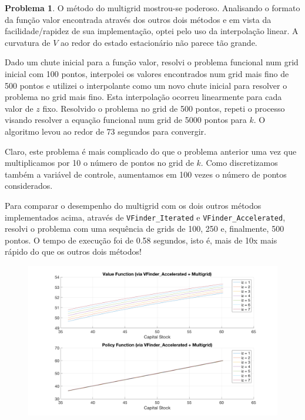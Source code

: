 \documentclass[11pt]{article}
\theoremstyle{definition}
\theoremstyle{definition}
\newtheorem{problema}{Problema}
\theoremstyle{solution}
\begin{document}
	
\begin{problema}
	O método do multigrid mostrou-se poderoso. Analisando o formato da função valor encontrada através dos outros dois métodos e em vista da facilidade/rapidez de sua implementação, optei pelo uso da interpolação linear. A curvatura de $V$ ao redor do estado estacionário não parece tão grande.
	
	Dado um chute inicial para a função valor, resolvi o problema funcional num grid inicial com 100 pontos, interpolei os valores encontrados num grid mais fino de 500 pontos e utilizei o interpolante como um novo chute inicial para resolver o problema no grid mais fino. Esta interpolação ocorreu linearmente para cada valor de $z$ fixo. Resolvido o problema no grid de 500 pontos, repeti o processo visando resolver a equação funcional num grid de 5000 pontos para $k$. O algoritmo levou ao redor de 73 segundos para convergir.
		
	Claro, este problema é mais complicado do que o problema anterior uma vez que multiplicamos por 10 o número de pontos no grid de $k$. Como discretizamos também a variável de controle, aumentamos em 100 vezes o número de pontos considerados. 
	
	Para comparar o desempenho do multigrid com os dois outros métodos implementados acima, através de \texttt{VFinder\_Iterated} e \texttt{VFinder\_Accelerated}, resolvi o problema com uma sequência de grids de 100, 250 e, finalmente, 500 pontos. O tempo de execução foi de 0.58 segundos, isto é, mais de 10x mais rápido do que os outros dois métodos!
	\begin{figure}[h!]
		\centering
		\includegraphics[scale = 0.25]{multigrid}
	\end{figure}
\end{problema}
	
\end{document}
